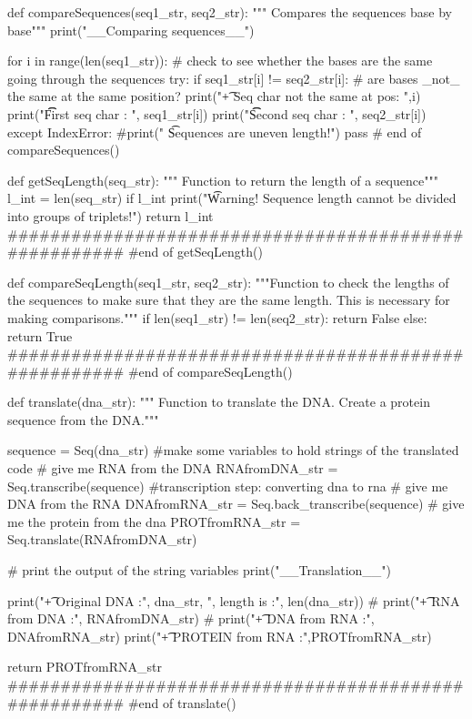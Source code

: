 def compareSequences(seq1_str, seq2_str):
    """ Compares the sequences base by base"""
    print("\n__Comparing sequences__")

    for i in range(len(seq1_str)):
        # check to see whether the bases are the same going through the sequences
        try:
            if seq1_str[i] != seq2_str[i]: # are bases _not_ the same at the same position?
                print("\t + Seq char not the same at pos: ",i)
                print("\t\t First seq char   : ", seq1_str[i])
                print("\t\t Second  seq char : ", seq2_str[i])
        except IndexError:
            #print(" \t Sequences are uneven length!")
            pass
# end of compareSequences()

def getSeqLength(seq_str):
    """ Function to return the length of a sequence"""
    l_int = len(seq_str)
    if l_int %
        print("\t Warning! Sequence length cannot be divided into groups of triplets!")
    return l_int
######################################################
#end of getSeqLength()

def compareSeqLength(seq1_str, seq2_str):
    """Function to check the lengths of the sequences to make sure that they are the same length. This is necessary for making comparisons."""
    if len(seq1_str) != len(seq2_str):
        return False
    else:
        return True
######################################################
#end of compareSeqLength()

def translate(dna_str):
    """ Function to translate the DNA. Create a protein sequence from the DNA."""

    sequence = Seq(dna_str)
    #make some variables to hold strings of the translated code
    # give me RNA from the DNA
    RNAfromDNA_str = Seq.transcribe(sequence) #transcription step: converting dna to rna
    # give me DNA from the RNA
    DNAfromRNA_str = Seq.back_transcribe(sequence)
    # give me the protein from the dna
    PROTfromRNA_str = Seq.translate(RNAfromDNA_str)

    # print the output of the string variables
    print("\n__Translation__")

    print("\t + Original DNA       :", dna_str, ", length is :", len(dna_str))
    # print("\t + RNA from DNA     :", RNAfromDNA_str)
    # print("\t + DNA from RNA     :", DNAfromRNA_str)
    print("\t + PROTEIN from RNA   :",PROTfromRNA_str)

    return PROTfromRNA_str
######################################################
#end of translate()



